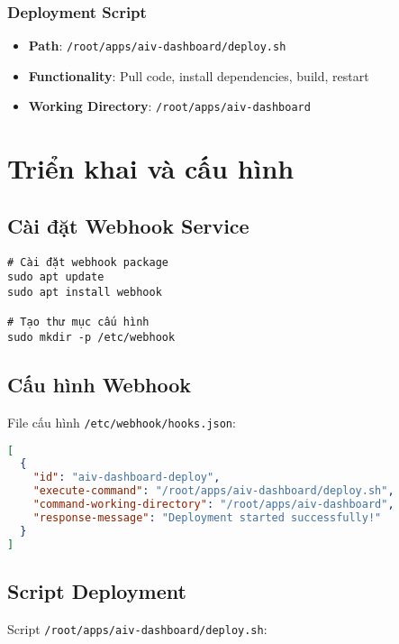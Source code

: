 \documentclass[12pt,a4paper]{article}
\begin{document}
\subsubsection{Deployment Script}
\begin{itemize}
    \item \textbf{Path}: \texttt{/root/apps/aiv-dashboard/deploy.sh}
    \item \textbf{Functionality}: Pull code, install dependencies, build, restart
    \item \textbf{Working Directory}: \texttt{/root/apps/aiv-dashboard}
\end{itemize}

\section{Triển khai và cấu hình}

\subsection{Cài đặt Webhook Service}

\begin{lstlisting}[caption=Cài đặt webhook package]
# Cài đặt webhook package
sudo apt update
sudo apt install webhook

# Tạo thư mục cấu hình
sudo mkdir -p /etc/webhook
\end{lstlisting}

\subsection{Cấu hình Webhook}

File cấu hình \texttt{/etc/webhook/hooks.json}:

\begin{lstlisting}[caption=Cấu hình webhook hooks.json, language=json]
[
  {
    "id": "aiv-dashboard-deploy",
    "execute-command": "/root/apps/aiv-dashboard/deploy.sh",
    "command-working-directory": "/root/apps/aiv-dashboard",
    "response-message": "Deployment started successfully!"
  }
]
\end{lstlisting}

\subsection{Script Deployment}

Script \texttt{/root/apps/aiv-dashboard/deploy.sh}:
\end{document}
